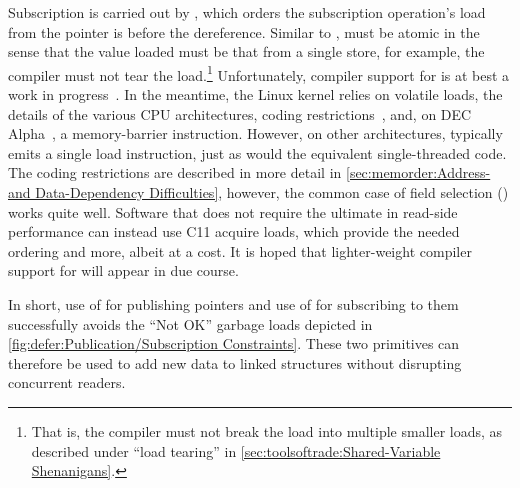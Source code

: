Subscription is carried out by , which orders
the subscription operation's load from the pointer is before the
dereference.
Similar to ,  must be
atomic in the sense that the value loaded must be that from a single
store, for example, the compiler must not tear the load.\footnote{
	That is, the compiler must not break the load into multiple
	smaller loads, as described under ``load tearing'' in
	\cref{sec:toolsoftrade:Shared-Variable Shenanigans}.}
Unfortunately, compiler support for  is at best
a work in progress~\cite{PaulEMcKennneyConsumeP0190R4,PaulEMcKenney2017markconsumeP0462R1,JFBastien2018P0750R1consume}.
In the meantime, the Linux kernel relies on volatile loads, the details of
the various CPU architectures, coding
restrictions~\cite{PaulEMcKenney2014rcu-dereference},
and, on DEC Alpha~\cite{ALPHA2002}, a memory-barrier instruction.
However, on other architectures,  typically
emits a single load instruction, just as would the equivalent single-threaded
code.
The coding restrictions are described in more detail in
\cref{sec:memorder:Address- and Data-Dependency Difficulties},
however, the common case of field selection (\qtco{->}) works quite well.
Software that does not require the ultimate in read-side performance
can instead use C11 acquire loads, which provide the needed ordering and
more, albeit at a cost.
It is hoped that lighter-weight compiler support for 
will appear in due course.

In short, use of  for publishing pointers and
use of  for subscribing to them successfully avoids the
``Not OK'' garbage loads depicted in
\cref{fig:defer:Publication/Subscription Constraints}.
These two primitives can therefore be used to add new data to linked
structures without disrupting concurrent readers.

